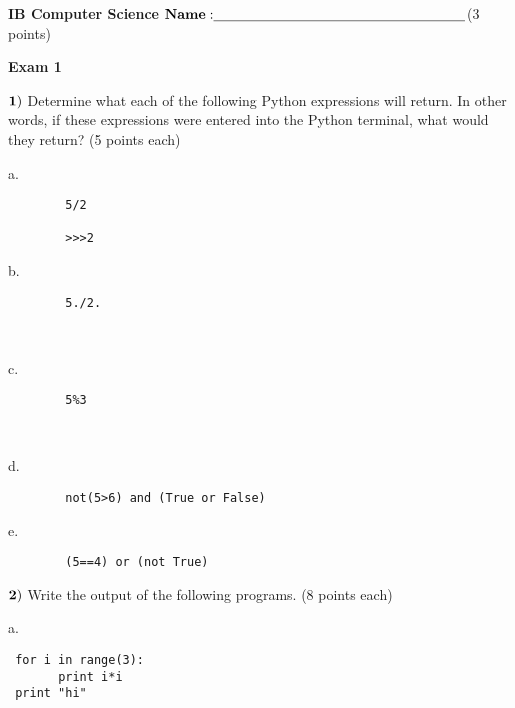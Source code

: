 \documentclass{article}
\begin{document}

\doublespacing
\textbf{IB Computer Science }                        %
 \hfill                             %
$ {\bf Name: } \underline{\hspace{2.5in}}$(3 points)

\begin{centering}
\vspace{1cm}
\textbf{Exam 1}\\
\end{centering}
\vspace{1cm}
 
$\bf{1)}$ Determine what each of the following Python expressions will return.  In other words, if these expressions were entered into the Python terminal, what would they return?
(5 points each)

\vspace{1cm}
  
 a.  
 \begin{verbatim}
 		5/2
		
		>>>2
 \end{verbatim}

 
 b.   \begin{verbatim}
 		5./2.
		
	
 \end{verbatim}
  
 
 c.  
  \begin{verbatim}
 		5%3
		
		
 \end{verbatim}
 \vspace{1cm}
  
 d. 
  \begin{verbatim}
 		not(5>6) and (True or False) 
 \end{verbatim}
 \vspace{1cm}
 
 e. 
  \begin{verbatim}
 		(5==4) or (not True) 
 \end{verbatim}
 \vspace{1cm}

  \newpage
  
 $\bf{2)}$ Write the output of the following programs. (8 points each)
 
 \vspace{1cm}

  
 a.   \begin{verbatim}
 for i in range(3):
       print i*i
 print "hi"
 \end{verbatim}
 \vspace{1cm}
 
\end{document}
